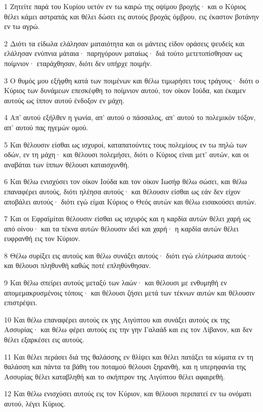 \par 1 Ζητείτε παρά του Κυρίου υετόν εν τω καιρώ της οψίμου βροχής· και ο Κύριος θέλει κάμει αστραπάς και θέλει δώσει εις αυτούς βροχάς όμβρου, εις έκαστον βοτάνην εν τω αγρώ.
\par 2 Διότι τα είδωλα ελάλησαν ματαιότητα και οι μάντεις είδον οράσεις ψευδείς και ελάλησαν ενύπνια μάταια· παρηγόρουν ματαίως· διά τούτο μετετοπίσθησαν ως ποίμνιον· εταράχθησαν, διότι δεν υπήρχε ποιμήν.
\par 3 Ο θυμός μου εξήφθη κατά των ποιμένων και θέλω τιμωρήσει τους τράγους· διότι ο Κύριος των δυνάμεων επεσκέφθη το ποίμνιον αυτού, τον οίκον Ιούδα, και έκαμεν αυτούς ως ίππον αυτού ένδοξον εν μάχη.
\par 4 Απ' αυτού εξήλθεν η γωνία, απ' αυτού ο πάσσαλος, απ' αυτού το πολεμικόν τόξον, απ' αυτού πας ηγεμών ομού.
\par 5 Και θέλουσιν είσθαι ως ισχυροί, καταπατούντες τους πολεμίους εν τω πηλώ των οδών, εν τη μάχη· και θέλουσι πολεμήσει, διότι ο Κύριος είναι μετ' αυτών, και οι αναβάται των ίππων θέλουσι καταισχυνθή.
\par 6 Και θέλω ενισχύσει τον οίκον Ιούδα και τον οίκον Ιωσήφ θέλω σώσει, και θέλω επαναφέρει αυτούς, διότι ηλέησα αυτούς· και θέλουσιν είσθαι ως εάν δεν είχον αποβάλει αυτούς· διότι εγώ είμαι Κύριος ο Θεός αυτών και θέλω εισακούσει αυτών.
\par 7 Και οι Εφραϊμίται θέλουσιν είσθαι ως ισχυρός και η καρδία αυτών θέλει χαρή ως από οίνου· και τα τέκνα αυτών θέλουσιν ιδεί και χαρή· η καρδία αυτών θέλει ευφρανθή εις τον Κύριον.
\par 8 Θέλω συρίξει εις αυτούς και θέλω συνάξει αυτούς· διότι εγώ ελύτρωσα αυτούς· και θέλουσι πληθυνθή καθώς ποτέ επληθύνθησαν.
\par 9 Και θέλω σπείρει αυτούς μεταξύ των λαών· και θέλουσι με ενθυμηθή εν απομεμακρυσμένοις τόποις· και θέλουσι ζήσει μετά των τέκνων αυτών και θέλουσιν επιστρέψει.
\par 10 Και θέλω επαναφέρει αυτούς εκ γης Αιγύπτου και συνάξει αυτούς εκ της Ασσυρίας· και θέλω φέρει αυτούς εις την γην Γαλαάδ και εις τον Λίβανον, και δεν θέλει εξαρκέσει εις αυτούς.
\par 11 Και θέλει περάσει διά της θαλάσσης εν θλίψει και θέλει πατάξει τα κύματα εν τη θαλάσση και πάντα τα βάθη του ποταμού θέλουσι ξηρανθή, και η υπερηφανία της Ασσυρίας θέλει καταβληθή και το σκήπτρον της Αιγύπτου θέλει αφαιρεθή.
\par 12 Και θέλω ενισχύσει αυτούς εις τον Κύριον, και θέλουσι περιπατεί εν τω ονόματι αυτού, λέγει Κύριος.

